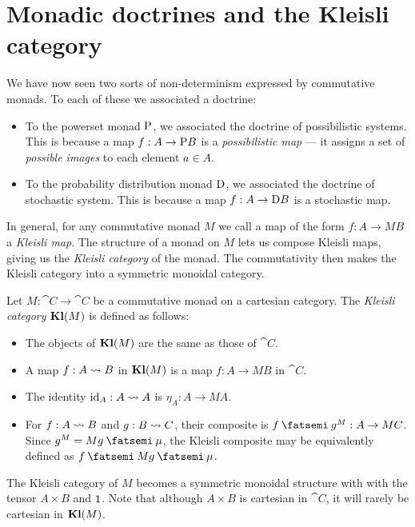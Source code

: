 \documentclass[DynamicalBook]{subfiles}
\begin{document}
\section{Monadic doctrines and the Kleisli category}\label{sec.monad_doctrine}
We have now seen two sorts of non-determinism expressed by commutative monads.
To each of these we associated a doctrine:
\begin{itemize}
  \item To the powerset monad $\mathrm{P}$, we associated the doctrine of
    possibilistic systems. This is because a map $f : A \to \mathrm{P} B$ is a
    \emph{possibilistic map} --- it assigns
    a set of \emph{possible images} to each element $a \in A$. 
  \item To the probability distribution monad $\mathrm{D}$, we associated the
    doctrine of stochastic system. This is because a map $f : A \to \mathrm{D} B$
    is a stochastic map.
\end{itemize}
In general, for any commutative monad $M$ we call a map of the form $f : A \to
MB$ a \emph{Kleisli map}. The structure of a monad on $M$ lets us compose
Kleisli maps, giving us the \emph{Kleisli category} of the monad. The
commutativity then makes the Kleisli category into a symmetric monoidal category.
\begin{definition}
  Let $M : \cat{C} \to \cat{C}$ be a commutative monad on a cartesian category. The \emph{Kleisli category} $\textbf{Kl}(M)$ is
  defined as follows:
  \begin{itemize}
    \item The objects of $\textbf{Kl}(M)$ are the same as those of $\cat{C}$.
    \item A map $f : A \rightsquigarrow B$ in $\textbf{Kl}(M)$ is a map $f : A \to MB$ in $\cat{C}$.
    \item The identity $\mathrm{id}_A : A \rightsquigarrow A$ is $\eta_A : A \to MA$.
    \item For $f : A \rightsquigarrow B$ and $g : B \rightsquigarrow C$, their composite is $f
      \then g^M : A \to MC$. Since $g^M = Mg \then \mu$, the Kleisli composite
      may be equivalently defined
      as $f \then Mg \then \mu$.
  \end{itemize}
  The Kleisli category of $M$ becomes a symmetric monoidal structure with with
  the tensor $A \times B$ and $\mathsf{1}$. Note that although $A \times B$ is
  cartesian in $\cat{C}$, it will rarely be cartesian in $\textbf{Kl}(M)$.
\end{definition}
\end{document}
